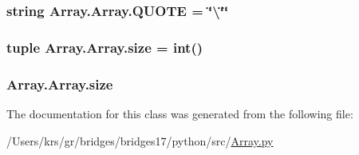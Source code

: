 \subsubsection[{Q\+U\+O\+T\+E}]{\setlength{\rightskip}{0pt plus 5cm}string Array.\+Array.\+Q\+U\+O\+T\+E = \char`\"{}\textbackslash{}\char`\"{}\char`\"{}\hspace{0.3cm}{\ttfamily [static]}}\label{class_array_1_1_array_ae6bdb390ddba8126d3746296feccbf3a}
\hypertarget{class_array_1_1_array_ae605a16bf709991444aa703af03ef63d}{}
\subsubsection[{size}]{\setlength{\rightskip}{0pt plus 5cm}tuple Array.\+Array.\+size = int()\hspace{0.3cm}{\ttfamily [static]}}\label{class_array_1_1_array_ae605a16bf709991444aa703af03ef63d}
\hypertarget{class_array_1_1_array_a421362e43ac706de326ea5442db7116b}{}
\subsubsection[{size}]{\setlength{\rightskip}{0pt plus 5cm}Array.\+Array.\+size}\label{class_array_1_1_array_a421362e43ac706de326ea5442db7116b}


The documentation for this class was generated from the following file\+:\begin{DoxyCompactItemize}
\item 
/\+Users/krs/gr/bridges/bridges17/python/src/\hyperlink{_array_8py}{Array.\+py}\end{DoxyCompactItemize}
